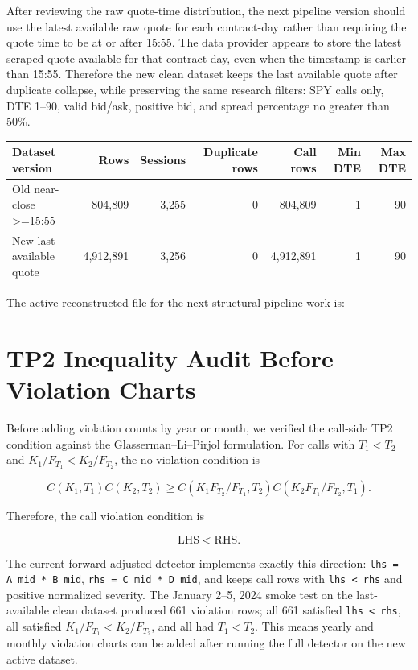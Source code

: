 \documentclass[11pt]{article}
\begin{document}
After reviewing the raw quote-time distribution, the next pipeline version
should use the latest available raw quote for each contract-day rather than
requiring the quote time to be at or after 15:55. The data provider appears to
store the latest scraped quote available for that contract-day, even when the
timestamp is earlier than 15:55. Therefore the new clean dataset keeps the
last available quote after duplicate collapse, while preserving the same
research filters: SPY calls only, DTE 1--90, valid bid/ask, positive bid, and
spread percentage no greater than 50\%.

\begingroup
\scriptsize
\begin{longtable}{lrrrrrr}
\toprule
Dataset version & Rows & Sessions & Duplicate rows & Call rows & Min DTE & Max DTE \\
\midrule
Old near-close >=15:55 & 804,809 & 3,255 & 0 & 804,809 & 1 & 90 \\
New last-available quote & 4,912,891 & 3,256 & 0 & 4,912,891 & 1 & 90 \\
\bottomrule
\end{longtable}
\endgroup

The active reconstructed file for the next structural pipeline work is:
\begin{quote}
\small{}
\end{quote}

\section*{TP2 Inequality Audit Before Violation Charts}

Before adding violation counts by year or month, we verified the call-side TP2
condition against the Glasserman--Li--Pirjol formulation. For calls with
$T_1<T_2$ and $K_1/F_{T_1}<K_2/F_{T_2}$, the no-violation condition is

\[
C(K_1,T_1)C(K_2,T_2)
\geq
C(K_1F_{T_2}/F_{T_1},T_2)C(K_2F_{T_1}/F_{T_2},T_1).
\]

Therefore, the call violation condition is

\[
\mathrm{LHS} < \mathrm{RHS}.
\]

The current forward-adjusted detector implements exactly this direction:
\texttt{lhs = A\_mid * B\_mid},
\texttt{rhs = C\_mid * D\_mid}, and keeps call rows with
\texttt{lhs < rhs} and positive normalized severity. The January 2--5, 2024
smoke test on the last-available clean dataset produced 661 violation rows;
all 661 satisfied \texttt{lhs < rhs}, all satisfied
$K_1/F_{T_1}<K_2/F_{T_2}$, and all had $T_1<T_2$. This means yearly and monthly
violation charts can be added after running the full detector on the new active
dataset.
\end{document}
